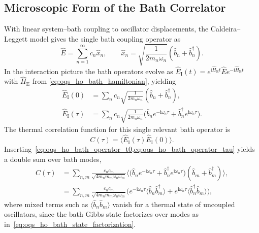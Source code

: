 \subsection{Microscopic Form of the Bath Correlator}
\label{subsec:oqs_microscopic_bath_correlator}

With linear system--bath coupling to oscillator displacements, the Caldeira--Leggett model \cite{hagstrommorrison2011caldeiraleggettmodel,breuerpetruccione2007theoryopenquantum} gives the single bath coupling operator as
\begin{equation*}
	\hat{E} = \sum_{n=1}^{\infty} c_n \hat{x}_n, \qquad \hat{x}_n = \sqrt{\frac{1}{2 m_n \omega_n}} (\hat{b}_n + \hat{b}_n^{\dagger}).
\end{equation*}
In the interaction picture the bath operators evolve as $\hat{E}_{\mathrm{I}}(t) = e^{\mathrm{i} \hat{H}_{\mathrm{E}} t} \hat{E} e^{-\mathrm{i} \hat{H}_{\mathrm{E}} t}$ with $\hat{H}_{\mathrm{E}}$ from \autoref{eq:oqs_ho_bath_hamiltonian}, yielding
\begin{align}
	\hat{E}_{\mathrm{I}}(0)    & = \sum_{n} c_n \sqrt{\frac{1}{2 m_n \omega_n}} (\hat{b}_n + \hat{b}_n^{\dagger}),
	\label{eq:oqs_ho_bath_operator_t0} \\
	\hat{E}_{\mathrm{I}}(\tau) & = \sum_{n} c_n \sqrt{\frac{1}{2 m_n \omega_n}} \Big(\hat{b}_n e^{-\mathrm{i} \omega_n \tau} + \hat{b}_n^{\dagger} e^{\mathrm{i} \omega_n \tau}\Big).
	\label{eq:oqs_ho_bath_operator_tau}
\end{align}
The thermal correlation function  for this single relevant bath operator is
\begin{equation*}
	C(\tau) = \langle \hat{E}_{\mathrm{I}}(\tau) \hat{E}_{\mathrm{I}}(0) \rangle.
\end{equation*}
Inserting~\cref{eq:oqs_ho_bath_operator_t0,eq:oqs_ho_bath_operator_tau} yields a double sum over bath modes,
\begin{align*}
	C(\tau) & = \sum_{n,m} \frac{c_n c_m}{\sqrt{4 m_n m_m \omega_n \omega_m}} \Big\langle \big(\hat{b}_n e^{-\mathrm{i} \omega_n \tau} + \hat{b}_n^{\dagger} e^{\mathrm{i} \omega_n \tau}\big) (\hat{b}_m + \hat{b}_m^{\dagger}) \Big\rangle,       \\[0.3em]
	        & = \sum_{n,m} \frac{c_n c_m}{\sqrt{4 m_n m_m \omega_n \omega_m}} \Big( e^{-\mathrm{i} \omega_n \tau} \langle \hat{b}_n \hat{b}_m^{\dagger} \rangle + e^{\mathrm{i} \omega_n \tau} \langle \hat{b}_n^{\dagger} \hat{b}_m \rangle \Big),
\end{align*}
where mixed terms such as $\langle \hat{b}_n \hat{b}_m \rangle$ vanish for a thermal state of uncoupled oscillators, since the bath Gibbs state factorizes over modes as in~\autoref{eq:oqs_ho_bath_state_factorization}.
